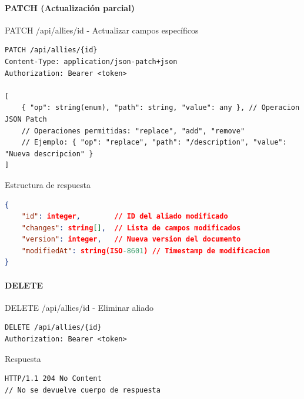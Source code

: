 \documentclass[11pt,a4paper]{article}
\begin{document}
\paragraph{PATCH (Actualización parcial)}
\begin{center}
	\begin{minipage}{\textwidth}
		\begin{codebox}{PATCH /api/allies/{id} - Actualizar campos específicos}
			\begin{lstlisting}[language=HTTP]
PATCH /api/allies/{id}
Content-Type: application/json-patch+json
Authorization: Bearer <token>

[
    { "op": string(enum), "path": string, "value": any }, // Operacion JSON Patch
    // Operaciones permitidas: "replace", "add", "remove"
    // Ejemplo: { "op": "replace", "path": "/description", "value": "Nueva descripcion" }
]
\end{lstlisting}
		\end{codebox}
	\end{minipage}
\end{center}

\begin{center}
	\begin{minipage}{\textwidth}
		\begin{codebox}{Estructura de respuesta}
			\begin{lstlisting}[language=json]
{
    "id": integer,        // ID del aliado modificado
    "changes": string[],  // Lista de campos modificados
    "version": integer,   // Nueva version del documento
    "modifiedAt": string(ISO-8601) // Timestamp de modificacion
}
\end{lstlisting}
		\end{codebox}
	\end{minipage}
\end{center}

\paragraph{DELETE}
\begin{center}
	\begin{minipage}{\textwidth}
		\begin{codebox}{DELETE /api/allies/{id} - Eliminar aliado}
			\begin{lstlisting}[language=HTTP]
DELETE /api/allies/{id}
Authorization: Bearer <token>
\end{lstlisting}
		\end{codebox}
	\end{minipage}
\end{center}

\begin{center}
	\begin{minipage}{\textwidth}
		\begin{codebox}{Respuesta}
			\begin{lstlisting}[language=HTTP]
HTTP/1.1 204 No Content
// No se devuelve cuerpo de respuesta
\end{lstlisting}
		\end{codebox}
	\end{minipage}
\end{center}
\end{document}
